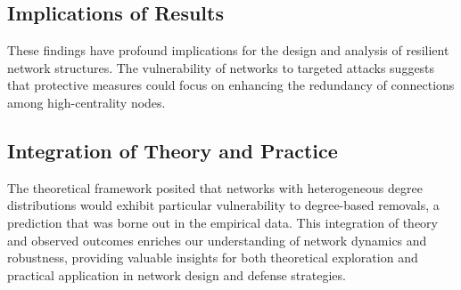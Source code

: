 \documentclass[
	report, %
	11pt, %
]{CSUniSchoolLabReport}
\newcounter{ct}
\begin{document}
\subsection{Implications of Results}

These findings have profound implications for the design and analysis of resilient network structures. The vulnerability of networks to targeted attacks suggests that protective measures could focus on enhancing the redundancy of connections among high-centrality nodes.

\subsection{Integration of Theory and Practice}

The theoretical framework posited that networks with heterogeneous degree distributions would exhibit particular vulnerability to degree-based removals, a prediction that was borne out in the empirical data. This integration of theory and observed outcomes enriches our understanding of network dynamics and robustness, providing valuable insights for both theoretical exploration and practical application in network design and defense strategies.

\clearpage
\end{document}
